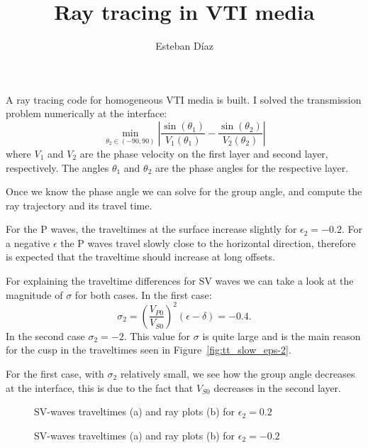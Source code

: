 \documentclass[10pt]{article}
\author{Esteban D\'{i}az}
\title{Ray tracing in VTI media}{}
\begin{document}
\maketitle

A ray tracing code for homogeneous VTI media is built.
I solved the transmission problem numerically at the interface:
\[
  \min_{\theta_2 \in (-90,90)} \left|\frac{\sin(\theta_1)}{V_1(\theta_1)} -\frac{\sin(\theta_2)}{V_2(\theta_2)}\right|
\]
where $V_1$ and $V_2$ are the phase velocity on the first layer and second layer, respectively. The angles $\theta_1$ and $\theta_2$ are the phase angles for the respective layer. 

Once we know the phase angle we can solve for the group angle, and compute the ray trajectory and its travel time.


For the P waves, the traveltimes at the surface increase slightly  for $\epsilon_2=-0.2$. For a negative $\epsilon$
the P waves travel slowly close to the horizontal direction, therefore is expected that the traveltime should
increase at long offsets.

For explaining the traveltime differences for SV waves we can take a look at the magnitude of $\sigma$ for both 
cases. In the first case:
    \[
     \sigma_2 = \left(\frac{V_{P0}}{V_{S0}}\right)^2(\epsilon-\delta) = -0.4.
    \]
In the second case $\sigma_2 = -2$. This value for $\sigma$ is quite large and is the main reason 
for the cusp in the traveltimes seen in Figure~\ref{fig:tt_slow_eps-2}. 

For the first case, with $\sigma_2$ relatively small, we see how the group angle decreases at the interface, this
is due to the fact that $V_{S0}$ decreases in the second layer. 




\begin{figure}
	\begin{center}
		\caption{SV-waves traveltimes (a) and ray plots (b) for $\epsilon_2=0.2$}	
  \end{center}
\end{figure}

\begin{figure}
	\begin{center}
		\caption{SV-waves traveltimes (a) and ray plots (b) for $\epsilon_2=-0.2$}	
  \end{center}
\end{figure}
\end{document}
